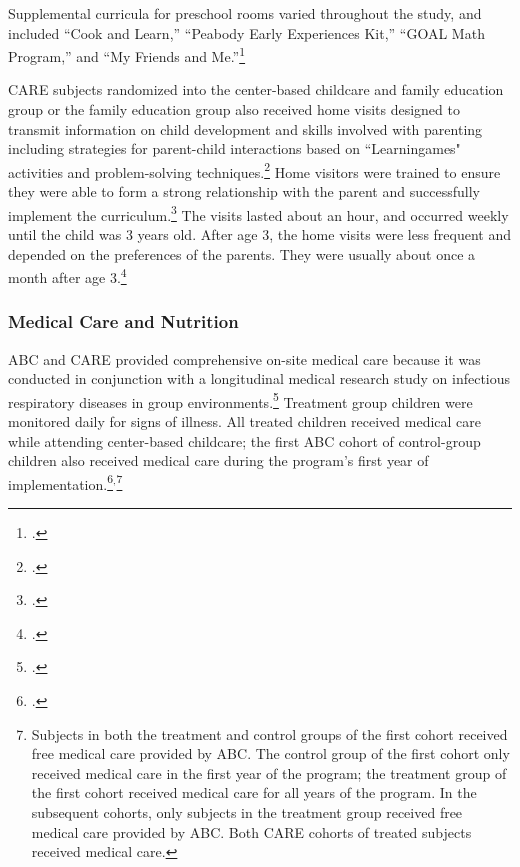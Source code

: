 \begin{appendices}
\noindent Supplemental curricula for preschool rooms varied throughout the study, and included ``Cook and Learn,'' ``Peabody Early Experiences Kit,'' ``GOAL Math Program,'' and ``My Friends and Me.''\footnote{ \citet{Greenberg_Epstein_1973_BOOKBridgestoreading,Karnes1973,Dunn_Chun_etal_1976_BOOKPeabodyearlyeducation,Davis_1977_BOOKMyfriends,Wallach_1976_Teaching-All-Children}.}

\noindent CARE subjects randomized into the center-based childcare and family education group or the family education group also received home visits designed to transmit information on child development and skills involved with parenting including strategies for parent-child interactions based on ``Learningames" activities and problem-solving techniques.\footnote{\citet{Bryant_et_al_1987_Carolina_Approach_TIECSE, Wasik_Ramey_etal_1990_CD, Burchinal_Campbell_etal_1997_CD}.} Home visitors were trained to ensure they were able to form a strong relationship with the parent and successfully implement the curriculum.\footnote{\citet{Bryant_et_al_1987_Carolina_Approach_TIECSE}.} The visits lasted about an hour, and occurred weekly until the child was 3 years old. After age 3, the home visits were less frequent and depended on the preferences of the parents. They were usually about once a month after age 3.\footnote{\citet{Bryant_et_al_1987_Carolina_Approach_TIECSE, Wasik_Ramey_etal_1990_CD, Burchinal_Campbell_etal_1997_CD}.} 

\subsubsection{Medical Care and Nutrition}
ABC and CARE provided comprehensive on-site medical care because it was conducted in conjunction with a longitudinal medical research study on infectious respiratory diseases in group environments.\footnote{\citet{Henderson-et-al_1982_NEJoM}.} Treatment group children were monitored daily for signs of illness. All treated children received medical care while attending center-based childcare; the first ABC cohort of control-group children also received medical care during the program's first year of implementation.\footnote{\citet{Ramey_Collier_etal_1976_CarolinaAbecedarianProject, Bryant_et_al_1987_Carolina_Approach_TIECSE, Ramey_Campbell_1991_childreninpoverty,Campbell_Ramey_1994_CD}.}$^{,}$\footnote{Subjects in both the treatment and control groups of the first cohort received free medical care provided by ABC. The control group of the first cohort only received medical care in the first year of the program; the treatment group of the first cohort received medical care for all years of the program. In the subsequent cohorts, only subjects in the treatment group received free medical care provided by ABC. Both CARE cohorts of treated subjects received medical care.}\\


\end{appendices}
